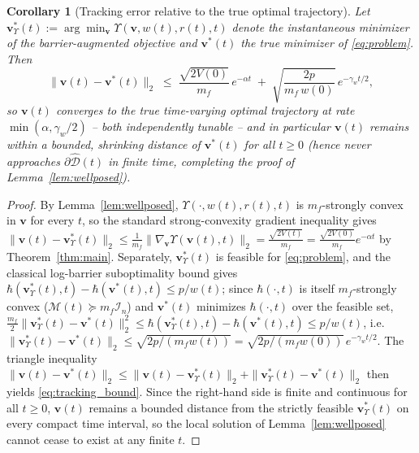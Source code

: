 \documentclass[pdflatex,sn-mathphys,Numbered]{sn-jnl}
\theoremstyle{thmstyleone}
\newtheorem{corollary}[theorem]{Corollary}
\theoremstyle{thmstyletwo}
\theoremstyle{thmstylethree}
\begin{document}
\begin{corollary}[Tracking error relative to the true optimal trajectory]\label{cor:tracking}
Let $\bm{v}^*_\Upsilon(t):=\arg\min_{\bm{v}}\Upsilon(\bm{v},w(t),r(t),t)$ denote the instantaneous minimizer of the barrier-augmented objective and $\bm{v}^*(t)$ the true minimizer of \eqref{eq:problem}. Then
\begin{equation}
\|\bm{v}(t)-\bm{v}^*(t)\|_2 \;\leq\; \frac{\sqrt{2V(0)}}{m_f}\,e^{-\alpha t} \;+\; \sqrt{\frac{2p}{m_f\,w(0)}}\,e^{-\gamma_w t/2},
\label{eq:tracking_bound}
\end{equation}
so $\bm{v}(t)$ converges to the true time-varying optimal trajectory at rate $\min(\alpha,\gamma_w/2)$ -- both independently tunable -- and in particular $\bm{v}(t)$ remains within a bounded, shrinking distance of $\bm{v}^*(t)$ for all $t\geq0$ (hence never approaches $\partial\widehat{\mathcal{D}}(t)$ in finite time, completing the proof of Lemma~\ref{lem:wellposed}).
\end{corollary}
\begin{proof}
By Lemma~\ref{lem:wellposed}, $\Upsilon(\cdot,w(t),r(t),t)$ is $m_f$-strongly convex in $\bm{v}$ for every $t$, so the standard strong-convexity gradient inequality gives $\|\bm{v}(t)-\bm{v}^*_\Upsilon(t)\|_2\leq\frac{1}{m_f}\|\nabla_{\bm{v}}\Upsilon(\bm{v}(t),t)\|_2=\frac{\sqrt{2V(t)}}{m_f}=\frac{\sqrt{2V(0)}}{m_f}e^{-\alpha t}$ by Theorem~\ref{thm:main}. Separately, $\bm{v}^*_\Upsilon(t)$ is feasible for \eqref{eq:problem}, and the classical log-barrier suboptimality bound \cite{book12} gives $\hbar(\bm{v}^*_\Upsilon(t),t)-\hbar(\bm{v}^*(t),t)\leq p/w(t)$; since $\hbar(\cdot,t)$ is itself $m_f$-strongly convex ($\mathcal{M}(t)\succeq m_f\mathcal{I}_n$) and $\bm{v}^*(t)$ minimizes $\hbar(\cdot,t)$ over the feasible set, $\frac{m_f}{2}\|\bm{v}^*_\Upsilon(t)-\bm{v}^*(t)\|_2^2\leq\hbar(\bm{v}^*_\Upsilon(t),t)-\hbar(\bm{v}^*(t),t)\leq p/w(t)$, i.e. $\|\bm{v}^*_\Upsilon(t)-\bm{v}^*(t)\|_2\leq\sqrt{2p/(m_f w(t))}=\sqrt{2p/(m_f w(0))}\,e^{-\gamma_w t/2}$. The triangle inequality $\|\bm{v}(t)-\bm{v}^*(t)\|_2\leq\|\bm{v}(t)-\bm{v}^*_\Upsilon(t)\|_2+\|\bm{v}^*_\Upsilon(t)-\bm{v}^*(t)\|_2$ then yields \eqref{eq:tracking_bound}. Since the right-hand side is finite and continuous for all $t\geq0$, $\bm{v}(t)$ remains a bounded distance from the strictly feasible $\bm{v}^*_\Upsilon(t)$ on every compact time interval, so the local solution of Lemma~\ref{lem:wellposed} cannot cease to exist at any finite $t$.
\end{proof}
\end{document}
